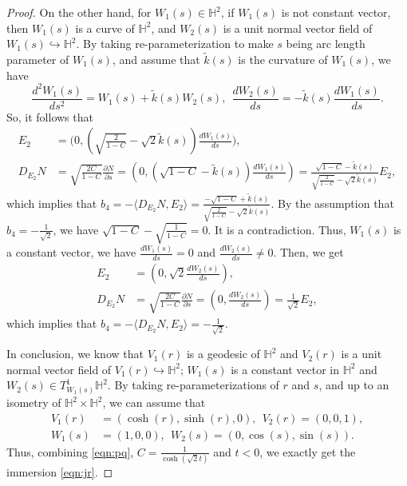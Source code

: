 \documentclass[10pt,a4paper]{amsart}
\begin{document}
\begin{proof}
On the other hand, for $W_1(s)\in \mathbb{H}^2$, if $W_1(s)$ is not constant vector,
then $W_1(s)$ is a curve of $\mathbb{H}^2$,
and $W_2(s)$ is a unit normal vector field of $W_1(s)\hookrightarrow\mathbb{H}^2$.
By taking re-parameterization to make $s$ being arc length parameter of $W_1(s)$, and assume that
$\tilde{k}(s)$ is the curvature of $W_1(s)$, we have
$$
\frac{d^2W_1(s)}{ds^2}=W_1(s)+\tilde{k}(s)W_2(s), \ \
\frac{dW_2(s)}{ds}=-\tilde{k}(s)\frac{dW_1(s)}{ds}.
$$
So, it follows that
$$
\begin{aligned}
E_2&=\Big(0,(\sqrt{\tfrac{2}{1-C}}-\sqrt{2}\tilde{k}(s))\tfrac{d W_1(s)}{ds}\Big),\\
D_{E_2}N&=\sqrt{\tfrac{2C}{1-C}}\tfrac{\partial N}{\partial s}=
(0,(\sqrt{1-C}-\tilde{k}(s))\tfrac{d W_1(s)}{d s})=\tfrac{\sqrt{1-C}-\tilde{k}(s)}{\sqrt{\tfrac{2}{1-C}}-\sqrt{2}\tilde{k}(s)}E_2,
\end{aligned}
$$
which implies that $b_4=-\langle D_{E_2}N,E_2\rangle=\frac{-\sqrt{1-C}+\tilde{k}(s)}{\sqrt{\frac{2}{1-C}}-\sqrt{2}\tilde{k}(s)}$.
By the assumption that $b_4=-\frac{1}{\sqrt{2}}$, we have $\sqrt{1-C}-\sqrt{\frac{1}{1-C}}=0$.
It is a contradiction. Thus, $W_1(s)$ is a constant vector, we have
$\frac{d W_1(s)}{ds}=0$ and $\frac{d W_2(s)}{ds}\neq0$.
Then, we get
$$
\begin{aligned}
E_2&=(0,\sqrt{2}\tfrac{d W_2(s)}{d s}),\\
D_{E_2}N&=\sqrt{\tfrac{2C}{1-C}}\tfrac{\partial N}{\partial s}=
(0,\tfrac{d W_2(s)}{d s})=\tfrac{1}{\sqrt{2}}E_2,
\end{aligned}
$$
which implies that $b_4=-\langle D_{E_2}N,E_2\rangle=-\frac{1}{\sqrt{2}}$.

In conclusion, we know that $V_1(r)$ is a geodesic of $\mathbb{H}^2$ and $V_2(r)$ is a unit normal
vector field of $V_1(r)\hookrightarrow\mathbb{H}^2$;
$W_1(s)$ is a constant vector in $\mathbb{H}^2$ and $W_2(s)\in T^1_{W_1(s)}\mathbb{H}^2$.
By taking re-parameterizations of $r$ and $s$, and up to an isometry of $\mathbb{H}^2\times \mathbb{H}^2$, we can assume that
$$
\begin{aligned}
V_1(r)&=(\cosh(r),\sinh(r),0),\ \ V_2(r)=(0,0,1),\\
W_1(s)&=(1,0,0), \ \ W_2(s)=(0,\cos(s),\sin(s)).
\end{aligned}
$$
Thus, combining \eqref{eqn:pq}, $C=\frac{1}{\cosh(\sqrt{2}t)}$ and $t<0$, we exactly get the immersion \eqref{eqn:jr}.
\end{proof}
\end{document}
